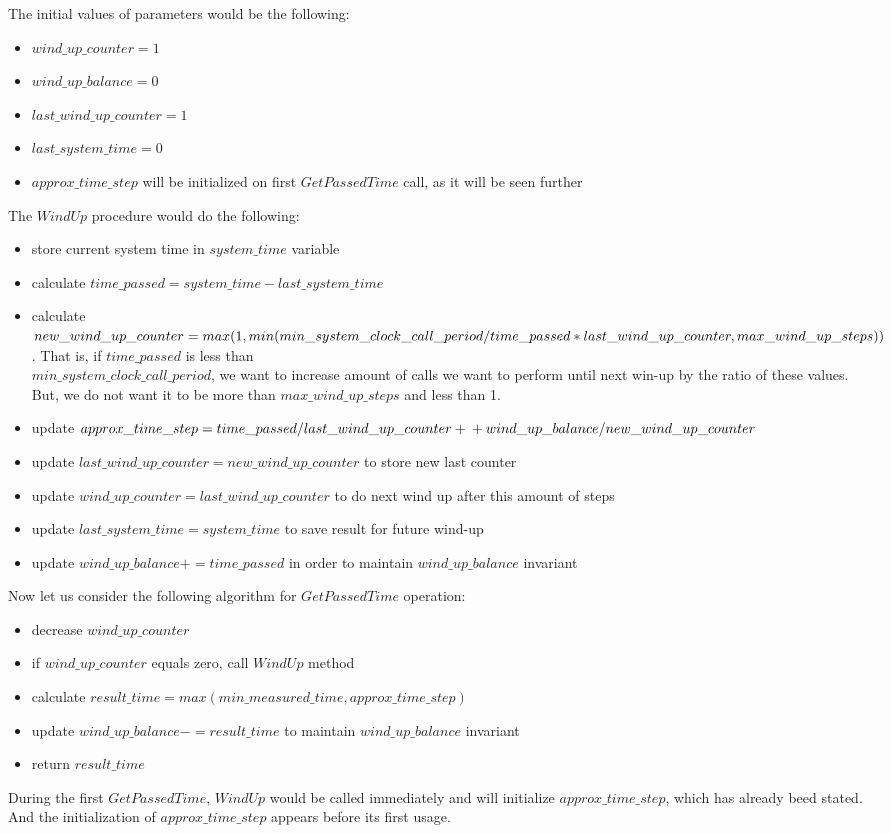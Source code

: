 \documentclass{article}
\begin{document}
The initial values of parameters would be the following:
\begin{itemize}
	\item $wind\_up\_counter = 1$
	\item $wind\_up\_balance = 0$
	\item $last\_wind\_up\_counter = 1$
	\item $last\_system\_time = 0$
	\item $approx\_time\_step$ will be initialized on first $GetPassedTime$ call, as it will be seen further
\end{itemize}

The $WindUp$ procedure would do the following:
\begin{itemize}
	\item store current system time in $system\_time$ variable
	\item calculate $time\_passed = system\_time - last\_system\_time$
	\item calculate $new\_wind\_up\_counter = max(1, \\min(min\_system\_clock\_call\_period / time\_passed * last\_wind\_up\_counter,\\ max\_wind\_up\_steps))$. That is, if $time\_passed$ is less than \\$min\_system\_clock\_call\_period$, we want to increase amount of calls we want to perform until next win-up by the ratio of these values. But, we do not want it to be more than $max\_wind\_up\_steps$ and less than 1.
	\item update $approx\_time\_step = time\_passed / last\_wind\_up\_counter +\\+ wind\_up\_balance / new\_wind\_up\_counter$
	\item update $last\_wind\_up\_counter = new\_wind\_up\_counter$ to store new last counter
	\item update $wind\_up\_counter = last\_wind\_up\_counter$ to do next wind up after this amount of steps
	\item update $last\_system\_time = system\_time$ to save result for future wind-up
	\item update $wind\_up\_balance += time\_passed$ in order to maintain $wind\_up\_balance$ invariant
\end{itemize}
Now let us consider the following algorithm for $GetPassedTime$ operation:
\begin{itemize}
	\item decrease $wind\_up\_counter$
	\item if $wind\_up\_counter$ equals zero, call $WindUp$ method
	\item calculate $result\_time = max(min\_measured\_time, approx\_time\_step)$
	\item update $wind\_up\_balance -= result\_time$ to maintain $wind\_up\_balance$ invariant
	\item return $result\_time$
\end{itemize}
During the first $GetPassedTime$, $WindUp$ would be called immediately and will initialize $approx\_time\_step$, which has already beed stated. And the initialization of $approx\_time\_step$ appears before its first usage.
\end{document}
